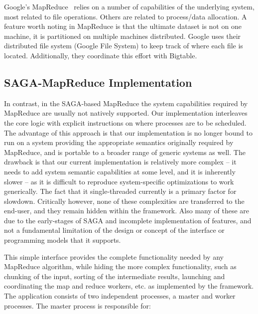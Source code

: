 \documentclass[conference,final]{IEEEtran}
\newcommand{\sagamapreduce }{SAGA-MapReduce }
\begin{document}


Google's MapReduce~\cite{mapreduce-paper} relies on a number of
capabilities of the underlying system, most related to file
operations.  Others are related to process/data allocation.  A feature
worth noting in MapReduce is that the ultimate dataset is not on one
machine, it is partitioned on multiple machines distributed. Google
uses their distributed file system (Google File System) to keep track
of where each file is located.  Additionally, they coordinate this
effort with Bigtable.  

\subsection{\sagamapreduce Implementation} In contrast, in the
SAGA-based MapReduce the system capabilities required by MapReduce are
usually not natively supported. Our implementation interleaves the
core logic with explicit instructions on where processes are to be
scheduled.  The advantage of this approach is that our implementation
is no longer bound to run on a system providing the appropriate
semantics originally required by MapReduce, and is portable to a
broader range of generic systems as well.  The drawback is that our
current implementation is relatively more complex -- it needs to add
system semantic capabilities at some level, and it is inherently
slower -- as it is difficult to reproduce system-specific
optimizations to work generically. The fact that it single-threaded
currently is a primary factor for slowdown.  Critically however, none
of these complexities are transferred to the end-user, and they remain
hidden within the framework. Also many of these are due to the
early-stages of SAGA and incomplete implementation of features, and
not a fundamental limitation of the design or concept of the interface
or programming models that it supports.

This simple interface provides the complete functionality needed by
any MapReduce algorithm, while hiding the more complex functionality,
such as chunking of the input, sorting of the intermediate results,
launching and coordinating the map and reduce workers, etc. as
implemented by the framework.  The application consists of two
independent processes, a master and worker processes. The master
process is responsible for:
\end{document}
